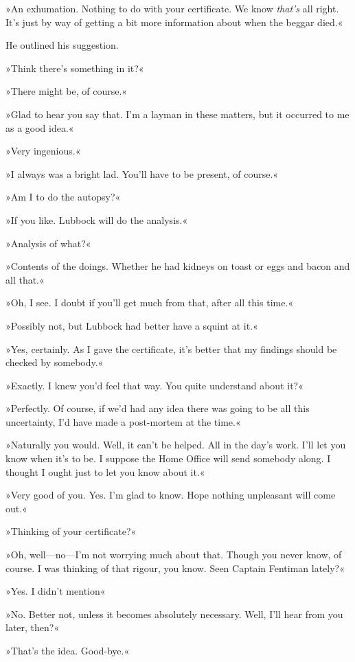 »An exhumation. Nothing to do with your certificate. We know \textit{that's} all right. It's just by way of getting a bit more information about when the beggar died.«

He outlined his suggestion.

»Think there's something in it?«

»There might be, of course.«

»Glad to hear you say that. I'm a layman in these matters, but it occurred to me as a good idea.«

»Very ingenious.«

»I always was a bright lad. You'll have to be present, of course.«

»Am I to do the autopsy?«

»If you like. Lubbock will do the analysis.«

»Analysis of what?«

»Contents of the doings. Whether he had kidneys on toast or eggs and bacon and all that.«

»Oh, I see. I doubt if you'll get much from that, after all this time.«

»Possibly not, but Lubbock had better have a squint at it.«

»Yes, certainly. As I gave the certificate, it's better that my findings should be checked by somebody.«

»Exactly. I knew you'd feel that way. You quite understand about it?«

»Perfectly. Of course, if we'd had any idea there was going to be all this uncertainty, I'd have made a post-mortem at the time.«

»Naturally you would. Well, it can't be helped. All in the day's work. I'll let you know when it's to be. I suppose the Home Office will send somebody along. I thought I ought just to let you know about it.«

»Very good of you. Yes. I'm glad to know. Hope nothing unpleasant will come out.«

»Thinking of your certificate?«

»Oh, well\allowbreak---\allowbreak no---I'm not worrying much about that. Though you never know, of course. I was thinking of that rigour, you know. Seen Captain Fentiman lately?«

»Yes. I didn't mention\longdash«

»No. Better not, unless it becomes absolutely necessary. Well, I'll hear from you later, then?«

»That's the idea. Good-bye.«

